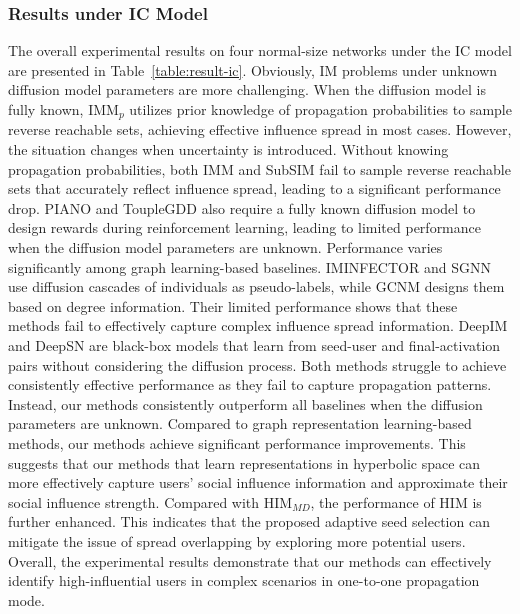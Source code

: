 \subsubsection{Results under IC Model}
The overall experimental results on four normal-size networks under the IC model are presented in Table~\ref{table:result-ic}.
Obviously, IM problems under unknown diffusion model parameters are more challenging. 
When the diffusion model is fully known, IMM$_p$ utilizes prior knowledge of propagation probabilities to sample reverse reachable sets, achieving effective influence spread in most cases.
However, the situation changes when uncertainty is introduced.
Without knowing propagation probabilities, both IMM and SubSIM fail to sample reverse reachable sets that accurately reflect influence spread, leading to a significant performance drop.
PIANO and ToupleGDD also require a fully known diffusion model to design rewards during reinforcement learning, leading to limited performance when the diffusion model parameters are unknown.
Performance varies significantly among graph learning-based baselines. 
IMINFECTOR and SGNN use diffusion cascades of individuals as pseudo-labels, while GCNM designs them based on degree information. Their limited performance shows that these methods fail to effectively capture complex influence spread information.
DeepIM and DeepSN are black-box models that learn from seed-user and final-activation pairs without considering the diffusion process. 
Both methods struggle to achieve consistently effective performance as they fail to capture propagation patterns.
Instead, our methods consistently outperform all baselines when the diffusion parameters are unknown.
Compared to graph representation learning-based methods, our methods achieve significant performance improvements.
This suggests that our methods that learn representations in hyperbolic space can more effectively capture users' social influence information and approximate their social influence strength.
Compared with HIM$_{MD}$, the performance of HIM is further enhanced. 
This indicates that the proposed adaptive seed selection can mitigate the issue of spread overlapping by exploring more potential users.
Overall, the experimental results demonstrate that our methods can effectively identify high-influential users in complex scenarios in one-to-one propagation mode.

